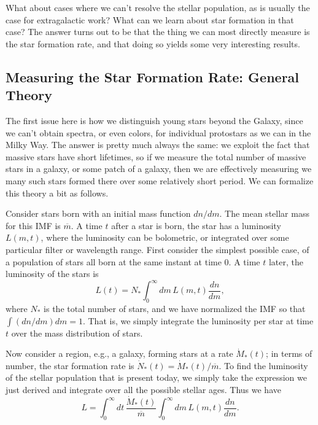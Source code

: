 What about cases where we can't resolve the stellar population, as is usually the case for extragalactic work? What can we learn about star formation in that case? The answer turns out to be that the thing we can most directly measure is the star formation rate, and that doing so yields some very interesting results.

\subsection{Measuring the Star Formation Rate: General Theory}

The first issue here is how we distinguish young stars beyond the Galaxy, since we can't obtain spectra, or even colors, for individual protostars as we can in the Milky Way. The answer is pretty much always the same: we exploit the fact that massive stars have short lifetimes, so if we measure the total number of massive stars in a galaxy, or some patch of a galaxy, then we are effectively measuring we many such stars formed there over some relatively short period. We can formalize this theory a bit as follows.

Consider stars born with an initial mass function $dn/dm$. The mean stellar mass for this IMF is $\overline{m}$. A time $t$ after a star is born, the star has a luminosity $L(m,t)$, where the luminosity can be bolometric, or integrated over some particular filter or wavelength range. First consider the simplest possible case, of a population of stars all born at the same instant at time $0$. A time $t$ later, the luminosity of the stars is
\begin{equation}
L(t) = N_* \int_0^{\infty} dm\, L(m,t) \frac{dn}{dm},
\end{equation}
where $N_*$ is the total number of stars, and we have normalized the IMF so that $\int (dn/dm) dm = 1$. That is, we simply integrate the luminosity per star at time $t$ over the mass distribution of stars.

Now consider a region, e.g., a galaxy, forming stars at a rate $\dot{M}_*(t)$; in terms of number, the star formation rate is $\dot{N}_*(t) = \dot{M}_*(t)/\overline{m}$. To find the luminosity of the stellar population that is present today, we simply take the expression we just derived and integrate over all the possible stellar ages. Thus we have
\begin{equation}
L =  \int_{0}^\infty dt \, \frac{\dot{M}_*(t)}{\overline{m}}  \int_0^{\infty} dm \, L(m,t) \frac{dn}{dm}.
\end{equation}

